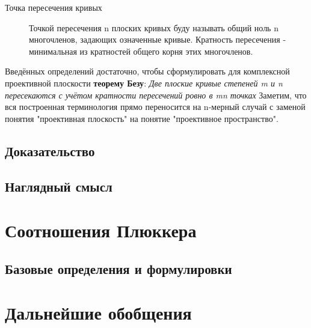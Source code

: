 \documentclass[a4paper, 12pt]{article}
\begin{document}
\begin{description}
\item[Точка пересечения кривых]
Точкой пересечения n плоских кривых буду называть общий ноль n многочленов, задающих означенные кривые. Кратность пересечения - минимальная из кратностей общего корня этих многочленов.
\end{description}
Введённых определений достаточно, чтобы сформулировать для комплексной проективной плоскости \textbf{теорему Безу}:
\textit{Две плоские кривые степеней m и n пересекаются с учётом кратности пересечений ровно в mn точках}
Заметим, что вся построенная терминология прямо переносится на n-мерный случай с заменой понятия "проективная плоскость" на понятие "проективное пространство".
\subsection{Доказательство}

\subsection{Наглядный смысл}
\section{Соотношения Плюккера}
\subsection{Базовые определения и формулировки}
\section{Дальнейшие обобщения}
\end{document}
